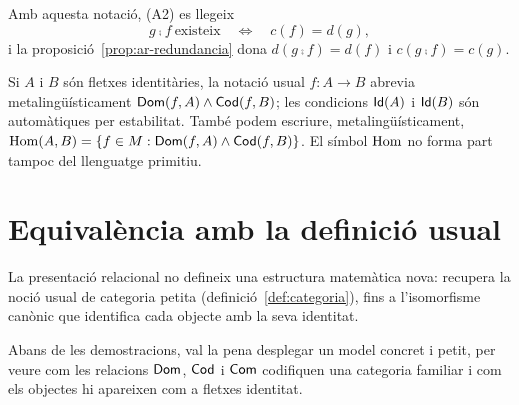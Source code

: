 Amb aquesta notació, (A2) es llegeix
\[
g\comp f\ \text{existeix}
\quad\Longleftrightarrow\quad
c(f)=d(g),
\]
i la proposició~\ref{prop:ar-redundancia} dona $d(g\comp f)=d(f)$ i $c(g\comp f)=c(g)$.

Si $A$ i $B$ són fletxes identitàries, la notació usual $f\colon A\longrightarrow B$ abrevia metalingüísticament $\mathsf{Dom}(f,A)\land\mathsf{Cod}(f,B)$; les condicions $\mathsf{Id}(A)$ i $\mathsf{Id}(B)$ són automàtiques per estabilitat. També podem escriure, metalingüísticament, $\operatorname{Hom}(A,B)=\{f\in M: \mathsf{Dom}(f,A)\land\mathsf{Cod}(f,B)\}$. El símbol $\operatorname{Hom}$ no forma part tampoc del llenguatge primitiu.

\section{Equivalència amb la definició usual}
\label{sec:ar-equivalencia}

La presentació relacional no defineix una estructura matemàtica nova: recupera la noció usual de categoria petita (definició~\ref{def:categoria}), fins a l'isomorfisme canònic que identifica cada objecte amb la seva identitat.

Abans de les demostracions, val la pena desplegar un model concret i petit, per veure com les relacions $\mathsf{Dom}$, $\mathsf{Cod}$ i $\mathsf{Com}$ codifiquen una categoria familiar i com els objectes hi apareixen com a fletxes identitat.

